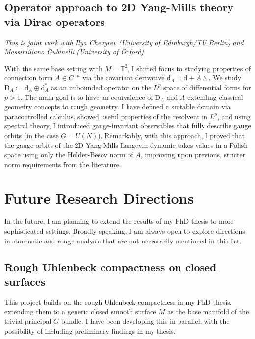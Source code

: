 \documentclass[11pt]{article}
\numberwithin{equation}{section}
\theoremstyle{definition}
\theoremstyle{remark}
\newcommand{\diff}{\mathrm{d}}
\newcommand{\1}{\mathbf 1}
\newcommand{\<}{\langle}
\renewcommand{\>}{\rangle}
\newcommand{\rmD}{\mathrm{D}}
\newcommand{\T}{\mathbb T}
\begin{document}
\subsection{Operator approach to 2D Yang-Mills theory via Dirac operators}\label{sec:Dirac_2D}
%
\textit{This is joint work with Ilya Chevyrev (University of Edinburgh/TU Berlin) and Massimiliano Gubinelli (University of Oxford).} 

\medskip 

\noindent With the same base setting with $M=\T^2$, I shifted focus to studying properties of connection form $A\in C^{-\kappa}$ via the covariant derivative $\diff_A = \diff + A\wedge $. We study $\rmD_A:=\diff_A\oplus\diff_A^*$ as an unbounded operator on the $L^p$  space of differential forms for $p>1$.  The main goal is to have an equivalence of $\rmD_A$ and $A$ extending classical geometry concepts to rough geometry. I have defined a suitable domain via paracontrolled calculus, showed useful properties of the resolvent in $L^p$, and using spectral theory, I introduced gauge-invariant observables that fully describe gauge orbits (in the case $G=U(N)$). Remarkably, with this approach, I proved that the gauge orbits of the 2D Yang-Mills Langevin dynamic takes values in a Polish space using only the H\"older-Besov norm of $A$, improving upon previous, stricter norm requirements from the literature. 

 

\section{Future Research Directions}\label{sec:future}
In the future, I am planning to extend the results of my PhD thesis to more sophisticated settings. Broadly speaking, I am always open to explore directions in stochastic and rough analysis that are not necessarily mentioned in this list. 



\subsection{Rough Uhlenbeck compactness on closed surfaces}
%
This project builds on the rough Uhlenbeck compactness in my PhD thesis, extending them to a generic closed smooth surface $M$ as the base manifold of the trivial principal $G$-bundle. I have been developing this in parallel, with the possibility of including preliminary findings in my thesis.
%
%
\end{document}

